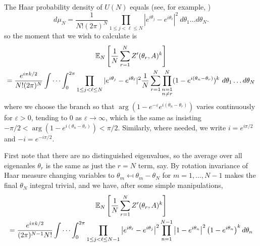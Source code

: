 \documentclass[12pt,a4paper,reqno]{amsart}
\theoremstyle{remark}
\numberwithin{equation}{section}
\begin{document}
The Haar probability density of $U(N)$ equals (see, for example, \cite{Weyl46})
\begin{equation}\label{eq:Weyl}
    d\mu_N = \frac{1}{N! (2 \pi)^N} \prod_{1 \leq j < \ell \leq N} |e^{i\theta_j} - e^{i\theta_\ell}|^2 \ d\theta_1 \ldots d\theta_N.
\end{equation}
so the moment that we wish to calculate is
\begin{multline*}
    \mathbb{E}_N \left[ \frac{1}{N} \sum_{r=1}^{N} Z'(\theta_r,A)^k   \right] \\
    = \frac{e^{i \pi k /2}}{N! (2 \pi)^N} \idotsint_{0}^{2\pi} \prod_{1 \leq j < \ell \leq N} |e^{i\theta_j} - e^{i\theta_\ell}|^2  \frac{1}{N} \sum_{r=1}^N \prod_{\substack{n=1 \\ n\neq r}}^{N} (1-e^{i(\theta_n-\theta_r)})^k \ d\theta_1 \dots d\theta_N
\end{multline*}
where we choose the branch so that $\arg(1-e^{-\varepsilon}e^{i(\theta_n-\theta_r)})$ varies continuously for $\varepsilon>0$, tending to $0$ as $\varepsilon \to \infty$, which is the same as insisting $-\pi/2 < \arg(1-e^{i(\theta_n-\theta_r)}) < \pi/2$. Similarly, where needed, we write $i=e^{i \pi /2}$ and $-i=e^{-i \pi / 2}$.

First note that there are no distinguished eigenvalues, so the average over all eigenanles $\theta_r$ is the same as just the $r=N$ term, say.  By rotation invariance of Haar measure changing variables to $\theta_m \mapsfrom \theta_m - \theta_N$ for $m=1,\dots,N-1$ makes the final $\theta_N$ integral trivial, and we have, after some simple manipulations,
\begin{multline*}
\mathbb{E}_N \left[ \frac{1}{N} \sum_{r=1}^{N} Z'(\theta_r,A)^k   \right]
\\=  \frac{e^{i \pi k /2}}{(2\pi)^{N-1} N!} \idotsint_0^{2\pi} \prod_{1 \leq j < \ell \leq N-1} \left|e^{i\theta_\ell} - e^{i\theta_j} \right|^2 \prod_{n=1}^{N-1}  \left|1-e^{i\theta_n}\right|^2 \left(1-e^{i\theta_n}\right)^k  d\theta_n
\end{multline*}
\end{document}
